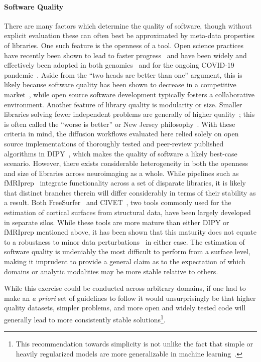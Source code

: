 \paragraph*{Software Quality}
There are many factors which determine the quality of software, though without explicit evaluation these can often
best be approximated by meta-data properties of libraries. One such feature is the openness of a tool. Open science
practices have recently been shown to lead to faster progress~\cite{munafo2017manifesto} and have been widely and
effectively been adopted in both genomics~\cite{goecks2010galaxy} and for the ongoing COVID-19
pandemic~\cite{besanccon2020open}. Aside from the ``two heads are better than one'' argument, this is likely
because software quality has been shown to decrease in a competitive market~\cite{raghunathan2005open}, while open
source software development typically fosters a collaborative environment. Another feature of library quality is
modularity or size. Smaller libraries solving fewer independent problems are generally of higher
quality~\cite{raghunathan2005open}; this is often called the ``worse is better'' or New Jersey
philosophy~\cite{gabriel1990worse}. With these criteria in mind, the diffusion workflows evaluated here relied
solely on open source implementations of thoroughly tested and peer-review published algorithms in
DIPY~\cite{Garyfallidis2014-ql,Garyfallidis2012-gg}, which makes the quality of software a likely best-case
scenario. However, there exists considerable heterogeneity in both the openness and size of libraries across
neuroimaging as a whole. While pipelines such as fMRIprep~\cite{esteban2019fmriprep} integrate functionality across
a set of disparate libraries, it is likely that distinct branches therein will differ considerably in terms of
their stability as a result. Both FreeSurfer~\cite{fischl2012freesurfer} and CIVET~\cite{lepage2017human}, two tools
commonly used for the estimation of cortical surfaces from structural data, have been largely developed in separate
silos. While these tools are more mature than either DIPY or fMRIprep mentioned above, it has been shown that this
maturity does not equate to a robustness to minor data perturbations~\cite{Lewis2017-ll} in either case. The
estimation of software quality is undeniably the most difficult to perform from a surface level, making it imprudent
to provide a general claim as to the expectation of which domains or analytic modalities may be more stable relative
to others.

While this exercise could be conducted across arbitrary domains, if one had to make an \textit{a priori} set of
guidelines to follow it would unsurprisingly be that higher quality datasets, simpler problems, and more open and
widely tested code will generally lead to more consistently stable solutions\footnote{This recommendation towards
simplicity is not unlike the fact that simple or heavily regularized models are more generalizable in machine
learning~\cite{lever2016regularization}.}.


